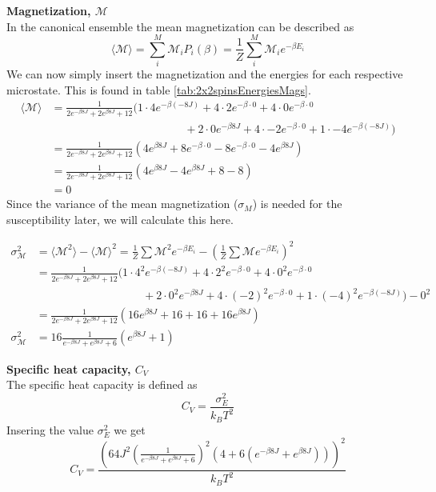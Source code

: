\documentclass[../main.tex]{subfiles}
\begin{document}
    \textbf{Magnetization, $\mathcal{M}$}\\
    In the canonical ensemble the mean magnetization can be described as
    \[\langle \mathcal{M} \rangle = \sum_i^M \mathcal{M}_i P_i(\beta) = \frac{1}{Z} \sum_i^M \mathcal{M}_i e^{-\beta E_i}\]
    We can now simply insert the magnetization and the energies for each respective microstate. This is found in table \ref{tab:2x2spinsEnergiesMags}.
    \begin{align*}
      \langle \mathcal{M} \rangle &= \frac{1}{2e^{-\beta 8J} + 2e^{\beta 8J} + 12} \Big( 1\cdot 4 e^{-\beta (-8J)} + 4 \cdot 2  e^{-\beta\cdot 0} + 4 \cdot 0e^{-\beta\cdot 0}\\
      &\hspace{5cm} + 2\cdot 0  e^{-\beta 8J} + 4 \cdot -2 e^{-\beta \cdot 0} + 1 \cdot -4 e^{-\beta (-8J)} \Big) \\
      &= \frac{1}{2e^{-\beta 8J} + 2e^{\beta 8J} + 12} \left(4 e^{\beta 8J} + 8e^{-\beta\cdot 0} - 8 e^{-\beta \cdot 0} -4 e^{\beta 8J} \right)\\
      &= \frac{1}{2e^{-\beta 8J} + 2e^{\beta 8J} + 12} \left( 4e^{\beta 8J} -4e^{\beta 8J} +8 -8 \right)\\
      &=0
    \end{align*}
    Since the variance of the mean magnetization ($\sigma_M$) is needed for the susceptibility later, we will calculate this here.

    \begin{align*}
      \sigma^2_\mathcal{M} &= \langle \mathcal{M}^2 \rangle - \langle \mathcal{M} \rangle ^2 = \frac{1}{Z}\sum \mathcal{M}^2 e^{-\beta E_i} - \left( \frac{1}{Z} \sum \mathcal{M} e^{-\beta E_i} \right)^2\\
      &= \frac{1}{2e^{-\beta 8J} + 2e^{\beta 8J} + 12} \Big( 1\cdot 4^2 e^{-\beta (-8J)} + 4 \cdot 2^2  e^{-\beta\cdot 0} + 4 \cdot 0^2 e^{-\beta\cdot 0}\\
      &\hspace{4cm} + 2\cdot 0^2  e^{-\beta 8J} + 4 \cdot (-2)^2 e^{-\beta \cdot 0} + 1 \cdot (-4)^2 e^{-\beta (-8J)} \Big) - 0^2\\
      &=\frac{1}{2e^{-\beta 8J} + 2e^{\beta 8J} + 12} \left(16e^{\beta 8J} + 16 + 16 + 16e^{\beta 8J} \right)\\
      \sigma^2_\mathcal{M} &=16 \frac{1}{e^{-\beta 8J} + e^{\beta 8J} + 6} \left(e^{\beta 8J} + 1\right)
    \end{align*}


    \textbf{Specific heat capacity, $C_V$}\\
    The specific heat capacity is defined as
    \[C_V = \frac{\sigma_E^2}{k_B T^2}\]
    Insering the value $\sigma^2_E$ we get
      \[C_V = \frac{\left( 64J^2 \left(\frac{1}{e^{-\beta 8J} + e^{\beta 8J} + 6}\right)^2  \left(4 + 6(e^{-\beta 8J} + e^{\beta 8J}) \right)\right)^2}{k_B T^2}\]
\end{document}
